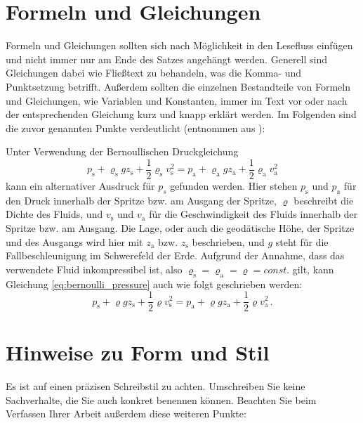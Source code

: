 \section{Formeln und Gleichungen}

Formeln und Gleichungen sollten sich nach Möglichkeit in den Lesefluss einfügen und nicht immer nur am Ende des Satzes angehängt werden. Generell sind Gleichungen dabei wie Fließtext zu behandeln, was die Komma- und Punktsetzung betrifft. Außerdem sollten die einzelnen Bestandteile von Formeln und Gleichungen, wie Variablen und Konstanten, immer im Text vor oder nach der entsprechenden Gleichung kurz und knapp erklärt werden. Im Folgenden sind die zuvor genannten Punkte verdeutlicht (entnommen aus \cite{MA_Kappel}):


Unter Verwendung der Bernoullischen Druckgleichung
\begin{equation}
	\label{eq:bernoulli_pressure}
	p_{\text{s}} +  \varrho_{\text{s}} g z_{\text{s}} + \frac{1}{2} \varrho_{\text{s}} v^{2}_{\text{s}} = p_{\text{a}} + \varrho_{\text{a}} g z_{\text{a}} + \frac{1}{2} \varrho_{\text{a}} v^{2}_{\text{a}}
\end{equation}
kann ein alternativer Ausdruck für $ p_{s} $ gefunden werden. Hier stehen $ p_{\text{s}} $ und $ p_{\text{a}} $ für den Druck innerhalb der Spritze bzw. am Ausgang der Spritze, $ \varrho $ beschreibt die Dichte des Fluids, und $ v_{\text{s}} $ und $ v_{\text{a}} $ für die Geschwindigkeit des Fluids innerhalb der Spritze bzw. am Ausgang. 
Die Lage, oder auch die geodätische Höhe, der Spritze und des Ausgangs wird hier mit $ z_{\text{a}} $ bzw. $ z_{\text{s}} $ beschrieben, und $ g $ steht für die Fallbeschleunigung im Schwerefeld der Erde.
Aufgrund der Annahme, dass das verwendete Fluid inkompressibel ist, also $ \varrho_{\text{s}} = \varrho_{\text{a}} = \varrho = const. $ gilt, kann Gleichung \ref{eq:bernoulli_pressure} auch wie folgt geschrieben werden:
\begin{equation}
	\label{eq:bernoulli_pressure_rearranged}
p_{\text{s}} +  \varrho g z_{\text{s}} + \frac{1}{2} \varrho v^{2}_{\text{s}} = p_{\text{a}} + \varrho g z_{\text{a}} + \frac{1}{2} \varrho v^{2}_{\text{a}} \, .
\end{equation}

\section{Hinweise zu Form und Stil}

Es ist auf einen präzisen Schreibstil zu achten. Umschreiben Sie keine Sachverhalte, die Sie auch konkret benennen können. Beachten Sie beim Verfassen Ihrer Arbeit außerdem diese weiteren Punkte:


